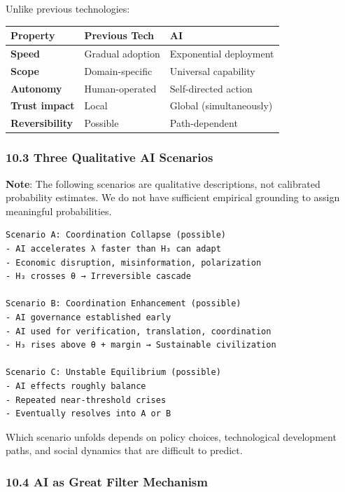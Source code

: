 \documentclass[11pt,letterpaper]{article}
\begin{document}
Unlike previous technologies:

\begin{longtable}[]{@{}lll@{}}
\toprule\noalign{}
Property & Previous Tech & AI \\
\midrule\noalign{}
\endhead
\bottomrule\noalign{}
\endlastfoot
\textbf{Speed} & Gradual adoption & Exponential deployment \\
\textbf{Scope} & Domain-specific & Universal capability \\
\textbf{Autonomy} & Human-operated & Self-directed action \\
\textbf{Trust impact} & Local & Global (simultaneously) \\
\textbf{Reversibility} & Possible & Path-dependent \\
\end{longtable}

\subsubsection{10.3 Three Qualitative AI
Scenarios}\label{three-qualitative-ai-scenarios}

\textbf{Note}: The following scenarios are qualitative descriptions, not
calibrated probability estimates. We do not have sufficient empirical
grounding to assign meaningful probabilities.

\begin{verbatim}
Scenario A: Coordination Collapse (possible)
- AI accelerates λ faster than H₃ can adapt
- Economic disruption, misinformation, polarization
- H₃ crosses θ → Irreversible cascade

Scenario B: Coordination Enhancement (possible)
- AI governance established early
- AI used for verification, translation, coordination
- H₃ rises above θ + margin → Sustainable civilization

Scenario C: Unstable Equilibrium (possible)
- AI effects roughly balance
- Repeated near-threshold crises
- Eventually resolves into A or B
\end{verbatim}

Which scenario unfolds depends on policy choices, technological
development paths, and social dynamics that are difficult to predict.

\subsubsection{10.4 AI as Great Filter
Mechanism}\label{ai-as-great-filter-mechanism}
\end{document}
